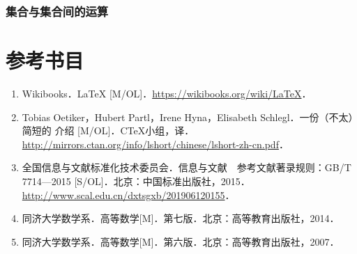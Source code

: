 \subsection{集合与集合间的运算}
%
%

\appendix

\chapter{参考书目}
%
\begin{enumerate}
	\item Wikibooks．LaTeX [M/OL]．\url{https://wikibooks.org/wiki/LaTeX}．
	\item Tobias Oetiker，Hubert Partl，Irene Hyna，Elisabeth Schlegl．一份（不太）简短的 \LaTeXe 介绍 [M/OL]．C\TeX 小组，译．\newline
	      \url{http://mirrors.ctan.org/info/lshort/chinese/lshort-zh-cn.pdf}．
	\item 全国信息与文献标准化技术委员会．信息与文献　参考文献著录规则：GB/T 7714—2015 [S/OL]．北京：中国标准出版社，2015．\newline
	      \url{http://www.scal.edu.cn/dxtsgxb/201906120155}．
	\item 同济大学数学系．高等数学[M]．第七版．北京：高等教育出版社，2014．
	\item 同济大学数学系．高等数学[M]．第六版．北京：高等教育出版社，2007．
\end{enumerate}
%



